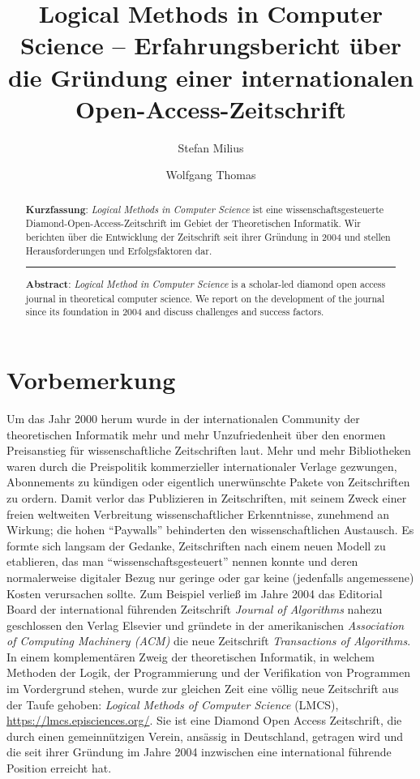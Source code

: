 \documentclass[a4paper,
fontsize=11pt,
oneside,
numbers=noperiodatend,
parskip=half-,
bibliography=totoc,
final
]{scrartcl}
\title{\LARGE{Logical Methods in Computer Science -- Erfahrungsbericht über die Gründung einer internationalen Open-Access-Zeitschrift}}%
\author{Stefan Milius \and Wolfgang Thomas} %
\date{}
\begin{document}
\maketitle
\thispagestyle{fancyplain} 

\begin{abstract}
\noindent
\textbf{Kurzfassung}: \emph{Logical Methods in Computer Science} ist
eine wissenschaftsgesteuerte Diamond-Open-Access-Zeitschrift im Gebiet
der Theoretischen Informatik. Wir berichten über die Entwicklung der
Zeitschrift seit ihrer Gründung in 2004 und stellen Herausforderungen
und Erfolgsfaktoren dar.

\begin{center}\rule{0.5\linewidth}{0.5pt}\end{center}

\textbf{Abstract}: \emph{Logical Method in Computer Science} is a
scholar-led diamond open access journal in theoretical computer science.
We report on the development of the journal since its foundation in 2004
and discuss challenges and success factors.
\end{abstract}

\hypertarget{vorbemerkung}{%
\section{Vorbemerkung}\label{vorbemerkung}}

Um das Jahr 2000 herum wurde in der internationalen Community der
theoretischen Informatik mehr und mehr Unzufriedenheit über den enormen
Preisanstieg für wissenschaftliche Zeitschriften laut. Mehr und mehr
Bibliotheken waren durch die Preispolitik kommerzieller internationaler
Verlage gezwungen, Abonnements zu kündigen oder eigentlich unerwünschte
Pakete von Zeitschriften zu ordern. Damit verlor das Publizieren in
Zeitschriften, mit seinem Zweck einer freien weltweiten Verbreitung
wissenschaftlicher Erkenntnisse, zunehmend an Wirkung; die hohen
\enquote{Paywalls} behinderten den wissenschaftlichen Austausch. Es
formte sich langsam der Gedanke, Zeitschriften nach einem neuen Modell
zu etablieren, das man \enquote{wissenschaftsgesteuert} nennen konnte
und deren normalerweise digitaler Bezug nur geringe oder gar keine
(jedenfalls angemessene) Kosten verursachen sollte. Zum Beispiel verließ
im Jahre 2004 das Editorial Board der international führenden
Zeitschrift \emph{Journal of Algorithms} nahezu geschlossen den Verlag
Elsevier und gründete in der amerikanischen \emph{Association of
Computing Machinery (ACM)} die neue Zeitschrift \emph{Transactions of
Algorithms}. In einem komplementären Zweig der theoretischen Informatik,
in welchem Methoden der Logik, der Programmierung und der Verifikation
von Programmen im Vordergrund stehen, wurde zur gleichen Zeit eine
völlig neue Zeitschrift aus der Taufe gehoben: \emph{Logical Methods of
Computer Science} (LMCS), \url{https://lmcs.episciences.org/}. Sie ist
eine Diamond Open Access Zeitschrift, die durch einen gemeinnützigen
Verein, ansässig in Deutschland, getragen wird und die seit ihrer
Gründung im Jahre 2004 inzwischen eine international führende Position
erreicht hat.
\end{document}
